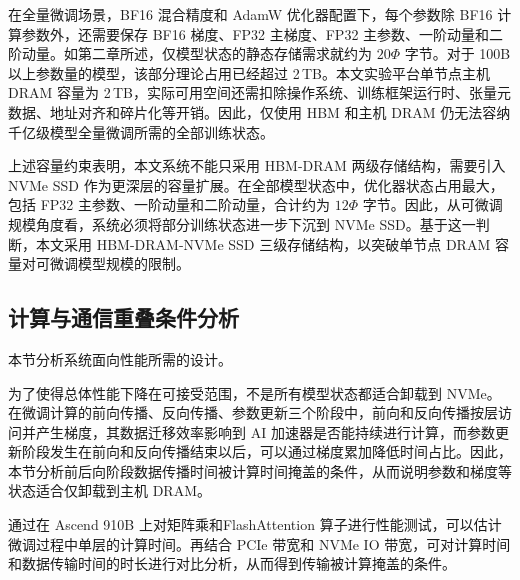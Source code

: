 \documentclass[bachelor,openany,oneside,color,AutoFakeBold=true]{buaathesis}
\begin{document}
在全量微调场景，BF16 混合精度和 AdamW 优化器配置下，每个参数除 BF16 计算参数外，还需要保存 BF16 梯度、FP32 主梯度、FP32 主参数、一阶动量和二阶动量。如第二章所述，仅模型状态的静态存储需求就约为 $20\Phi$ 字节。对于 100B 以上参数量的模型，该部分理论占用已经超过 2\,TB。本文实验平台单节点主机 DRAM 容量为 2\,TB，实际可用空间还需扣除操作系统、训练框架运行时、张量元数据、地址对齐和碎片化等开销。因此，仅使用 HBM 和主机 DRAM 仍无法容纳千亿级模型全量微调所需的全部训练状态。

上述容量约束表明，本文系统不能只采用 HBM-DRAM 两级存储结构，需要引入 NVMe SSD 作为更深层的容量扩展。在全部模型状态中，优化器状态占用最大，包括 FP32 主参数、一阶动量和二阶动量，合计约为 $12\Phi$ 字节。因此，从可微调规模角度看，系统必须将部分训练状态进一步下沉到 NVMe SSD。基于这一判断，本文采用 HBM-DRAM-NVMe SSD 三级存储结构，以突破单节点 DRAM 容量对可微调模型规模的限制。

\subsection{计算与通信重叠条件分析}

本节分析系统面向性能所需的设计。

为了使得总体性能下降在可接受范围，不是所有模型状态都适合卸载到 NVMe。在微调计算的前向传播、反向传播、参数更新三个阶段中，前向和反向传播按层访问并产生梯度，其数据迁移效率影响到 AI 加速器是否能持续进行计算，而参数更新阶段发生在前向和反向传播结束以后，可以通过梯度累加降低时间占比。因此，本节分析前后向阶段数据传播时间被计算时间掩盖的条件，从而说明参数和梯度等状态适合仅卸载到主机 DRAM。

通过在 Ascend 910B 上对矩阵乘和FlashAttention 算子进行性能测试，可以估计微调过程中单层的计算时间。再结合 PCIe 带宽和 NVMe IO 带宽，可对计算时间和数据传输时间的时长进行对比分析，从而得到传输被计算掩盖的条件。
\end{document}
